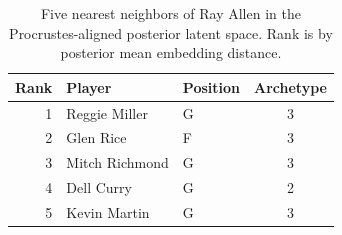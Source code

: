 \begin{table}[htbp]
  \centering\small
  \begin{tabular}{rllc}
    \toprule
    Rank & Player & Position & Archetype \\
    \midrule
    1 & Reggie Miller & G & 3 \\
    2 & Glen Rice & F & 3 \\
    3 & Mitch Richmond & G & 3 \\
    4 & Dell Curry & G & 2 \\
    5 & Kevin Martin & G & 3 \\
    \bottomrule
  \end{tabular}
  \caption{Five nearest neighbors of Ray Allen in the Procrustes-aligned posterior latent space. Rank is by posterior mean embedding distance.}
  \label{tab:Ray_Allen_neighbors}
\end{table}

